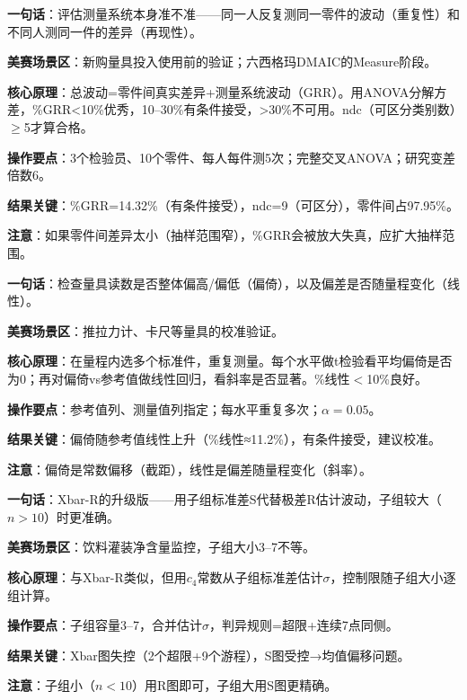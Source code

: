 
\begin{algobrief}
\textbf{一句话}：评估测量系统本身准不准——同一人反复测同一零件的波动（重复性）和不同人测同一件的差异（再现性）。

\textbf{美赛场景区}：新购量具投入使用前的验证；六西格玛DMAIC的Measure阶段。

\textbf{核心原理}：总波动=零件间真实差异+测量系统波动（GRR）。用ANOVA分解方差，\%GRR<10\%优秀，10--30\%有条件接受，>30\%不可用。ndc（可区分类别数）$\geq$5才算合格。

\textbf{操作要点}：3个检验员、10个零件、每人每件测5次；完整交叉ANOVA；研究变差倍数6。

\textbf{结果关键}：\%GRR=14.32\%（有条件接受），ndc=9（可区分），零件间占97.95\%。

\textbf{注意}：如果零件间差异太小（抽样范围窄），\%GRR会被放大失真，应扩大抽样范围。
\end{algobrief}


\begin{algobrief}
\textbf{一句话}：检查量具读数是否整体偏高/偏低（偏倚），以及偏差是否随量程变化（线性）。

\textbf{美赛场景区}：推拉力计、卡尺等量具的校准验证。

\textbf{核心原理}：在量程内选多个标准件，重复测量。每个水平做t检验看平均偏倚是否为0；再对偏倚vs参考值做线性回归，看斜率是否显著。\%线性$<$10\%良好。

\textbf{操作要点}：参考值列、测量值列指定；每水平重复多次；$\alpha=0.05$。

\textbf{结果关键}：偏倚随参考值线性上升（\%线性≈11.2\%），有条件接受，建议校准。

\textbf{注意}：偏倚是常数偏移（截距），线性是偏差随量程变化（斜率）。
\end{algobrief}


\begin{algobrief}
\textbf{一句话}：Xbar-R的升级版——用子组标准差S代替极差R估计波动，子组较大（$n>10$）时更准确。

\textbf{美赛场景区}：饮料灌装净含量监控，子组大小3--7不等。

\textbf{核心原理}：与Xbar-R类似，但用$c_4$常数从子组标准差估计$\sigma$，控制限随子组大小逐组计算。

\textbf{操作要点}：子组容量3--7，合并估计$\sigma$，判异规则=超限+连续7点同侧。

\textbf{结果关键}：Xbar图失控（2个超限+9个游程），S图受控→均值偏移问题。

\textbf{注意}：子组小（$n<10$）用R图即可，子组大用S图更精确。
\end{algobrief}


